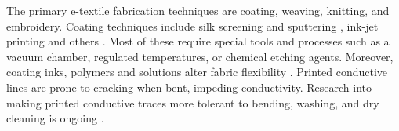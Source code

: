 


The primary e-textile fabrication techniques are coating, weaving, knitting, and embroidery.
Coating techniques include silk screening and sputtering \cite{kim2010electrical}, ink-jet printing \cite{stempien2017shape} and others  \cite{castano2014smart}. %
Most of these require special tools and processes such as a vacuum chamber, regulated temperatures, or chemical etching agents. 
Moreover, coating inks, polymers and solutions alter fabric flexibility \cite{farboodmanesh2005effect}. 
Printed conductive lines are prone to cracking when bent, impeding conductivity. 
Research into making printed conductive traces more tolerant to bending, washing, and dry cleaning is ongoing \cite{yang2013waterproof,stempien2017shape}.




